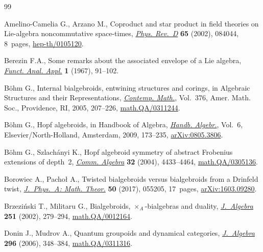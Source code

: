 \documentclass[pdftex]{sigma}
\numberwithin{equation}{section}
\begin{document}
\begin{thebibliography}{99}
\footnotesize\itemsep=0pt

Amelino-Camelia G., Arzano M., Coproduct and star product in field theories on
 {L}ie-algebra noncommutative space-times, \href{https://doi.org/10.1103/PhysRevD.65.084044}{\textit{Phys. Rev.~D}} \textbf{65}
 (2002), 084044, 8~pages, \href{https://arxiv.org/abs/hep-th/0105120}{hep-th/0105120}.

Berezin F.A., Some remarks about the associated envelope of a {L}ie algebra,
 \href{https://doi.org/10.1007/BF01076082}{\textit{Funct. Anal. Appl.}} \textbf{1} (1967), 91--102.

B\"ohm G., Internal bialgebroids, entwining structures and corings, in
 Algebraic Structures and their Representations, \href{https://doi.org/10.1090/conm/376/06959}{\textit{Contemp. Math.}}, Vol.~376, Amer. Math. Soc., Providence, RI, 2005, 207--226, \href{https://arxiv.org/abs/math.QA/0311244}{math.QA/0311244}.

B\"ohm G., Hopf algebroids, in Handbook of Algebra, \href{https://doi.org/10.1016/S1570-7954(08)00205-2}{\textit{Handb.
 Algebr.}}, Vol.~6, Elsevier/North-Holland, Amsterdam, 2009, 173--235,
 \href{https://arxiv.org/abs/0805.3806}{arXiv:0805.3806}.

B\"ohm G., Szlach\'anyi K., Hopf algebroid symmetry of abstract {F}robenius
 extensions of depth~2, \href{https://doi.org/10.1081/AGB-200034171}{\textit{Comm. Algebra}} \textbf{32} (2004), 4433--4464,
 \href{https://arxiv.org/abs/math.QA/0305136}{math.QA/0305136}.

Borowiec A., Pacho{\l} A., Twisted bialgebroids versus bialgebroids from a
 {D}rinfeld twist, \href{https://doi.org/10.1088/1751-8121/50/5/055205}{\textit{J.~Phys.~A: Math. Theor.}} \textbf{50} (2017),
 055205, 17~pages, \href{https://arxiv.org/abs/1603.09280}{arXiv:1603.09280}.

Brzezi\'nski T., Militaru G., Bialgebroids, {$\times_A$}-bialgebras and
 duality, \href{https://doi.org/10.1006/jabr.2001.9101}{\textit{J.~Algebra}} \textbf{251} (2002), 279--294,
 \href{https://arxiv.org/abs/math.QA/0012164}{math.QA/0012164}.

Donin J., Mudrov A., Quantum groupoids and dynamical categories,
 \href{https://doi.org/10.1016/j.jalgebra.2006.01.001}{\textit{J.~Algebra}} \textbf{296} (2006), 348--384, \href{https://arxiv.org/abs/math.QA/0311316}{math.QA/0311316}.


\end{thebibliography}
\end{document}
